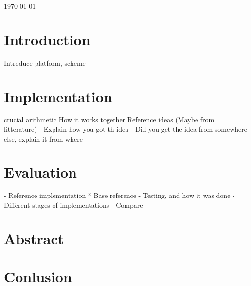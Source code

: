 \documentclass[12pt]{article}
\begin{document}
\begin{titlepage}
	
	
	\vfill\vfill\vfill %
	
	{\large{\today}} %

	
	\end{titlepage}
	\clearpage

    \tableofcontents
    \clearpage

    \section{Introduction}
    Introduce platform, scheme\\
    
    \section{Implementation}
    crucial arithmetic
    How it works together
    Reference ideas (Maybe from litterature)
    - Explain how you got th idea
    - Did you get the idea from somewhere else, explain it from where

    \section{Evaluation}
    - Reference implementation
     * Base reference
    - Testing, and how it was done
    - Different stages of implementations
    - Compare
    
    \section{Abstract}
    
    
    \section{Conlusion}
    

    \clearpage     
   
            
\end{document}

